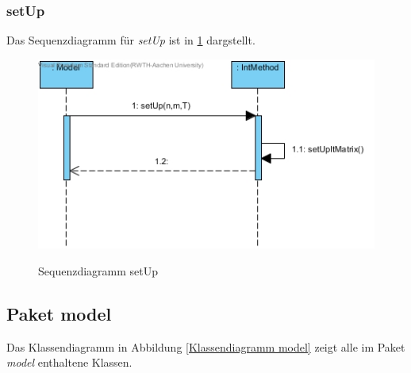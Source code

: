\subsubsection*{setUp}

Das Sequenzdiagramm für \emph{setUp} ist in \ref{Sequenzdiagramm setUp} dargstellt.

\begin{figure}[H]
	\centering
	\includegraphics[scale=.6]{Bilder/IntMethod__setUp().jpg}\\
	\caption{Sequenzdiagramm setUp}
	\label{Sequenzdiagramm setUp}
\end{figure}

\subsection{Paket model}

Das Klassendiagramm in Abbildung \ref{Klassendiagramm model} zeigt alle im Paket \emph{model} enthaltene Klassen.

